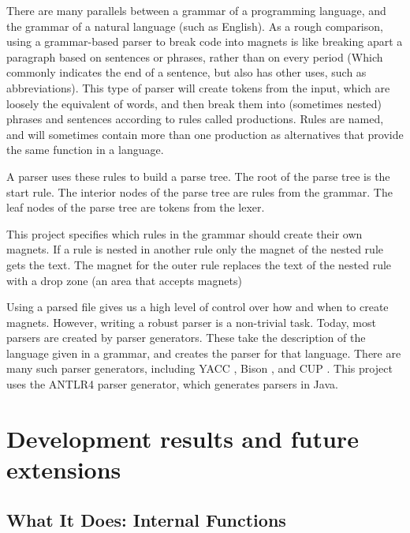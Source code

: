 \documentclass[letter,10pt,final]{article}
\begin{document}
There are many parallels between a grammar of a programming language, 
and the grammar of a natural language (such as English). 
As a rough comparison, using a grammar-based parser to 
break code into magnets is like breaking apart a paragraph based on 
sentences or phrases, rather than on every period (Which commonly 
indicates the end of a sentence, but also has other uses, such as 
abbreviations). This type of parser will create tokens from the input, 
which are loosely the equivalent of words, and then break them into 
(sometimes nested) phrases and sentences according to rules called 
productions. Rules are named, and will sometimes contain more than one 
production as alternatives that provide the same function in a 
language. 

A parser uses these rules to build a parse tree. The root of the parse 
tree is the start rule. The interior nodes of the parse tree are rules 
from the grammar. The leaf nodes of the parse tree are tokens from the 
lexer.

This project specifies which rules in the grammar should create their 
own magnets. If a rule is nested in another rule only the magnet of the 
nested rule gets the text. The magnet for the outer rule replaces the 
text of the nested rule with a drop zone (an area that accepts magnets)

Using a parsed file gives us a high level of control over how and when
to create magnets. However, writing a robust parser is a non-trivial 
task. Today, most parsers are created by parser generators. These take 
the description of the language given in a grammar, and creates the 
parser for that language. There are many such parser generators, 
including YACC \cite{yacc_homepage}, Bison \cite{bison_homepage}, and 
CUP \cite{cup_homepage}. This project uses the ANTLR4 
\cite{antlr_homepage} parser generator, which generates parsers in 
Java. 


\section{Development results and future extensions}

\subsection{What It Does: Internal Functions}
\end{document}
